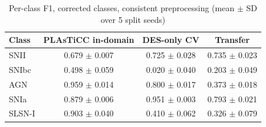 \begin{table}
\centering
\caption{Per-class F1, corrected classes, consistent preprocessing (mean $\pm$ SD over 5 split seeds)}
\begin{tabular}{lccc}
\hline
Class & PLAsTiCC in-domain & DES-only CV & Transfer \\
\hline
SNII & 0.679 $\pm$ 0.007 & 0.725 $\pm$ 0.028 & 0.735 $\pm$ 0.023 \\
SNIbc & 0.498 $\pm$ 0.059 & 0.020 $\pm$ 0.040 & 0.203 $\pm$ 0.049 \\
AGN & 0.959 $\pm$ 0.014 & 0.800 $\pm$ 0.017 & 0.373 $\pm$ 0.018 \\
SNIa & 0.879 $\pm$ 0.006 & 0.951 $\pm$ 0.003 & 0.793 $\pm$ 0.021 \\
SLSN-I & 0.903 $\pm$ 0.040 & 0.410 $\pm$ 0.062 & 0.326 $\pm$ 0.079 \\
\hline
\end{tabular}
\end{table}
